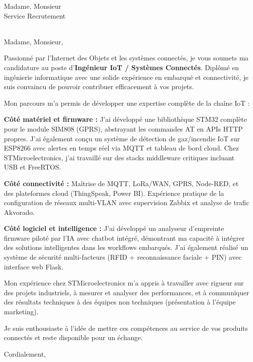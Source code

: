 \documentclass[11pt,a4paper]{letter}
\begin{document}
\begin{letter}{Madame, Monsieur \\ Service Recrutement \\ [Nom de l'entreprise] \\ [Adresse]}

\opening{Madame, Monsieur,}

Passionn\'e par l'Internet des Objets et les syst\`emes connect\'es, je vous soumets ma candidature au poste d'\textbf{Ing\'enieur IoT / Syst\`emes Connect\'es}. Dipl\^om\'e en ing\'enierie informatique avec une solide exp\'erience en embarqu\'e et connectivit\'e, je suis convaincu de pouvoir contribuer efficacement \`a vos projets.

Mon parcours m'a permis de d\'evelopper une expertise compl\`ete de la cha\^ine IoT :

\textbf{C\^ot\'e mat\'eriel et firmware :} J'ai d\'evelopp\'e une biblioth\`eque STM32 compl\`ete pour le module SIM808 (GPRS), abstrayant les commandes AT en APIs HTTP propres. J'ai \'egalement con\c{c}u un syst\`eme de d\'etection de gaz/incendie IoT sur ESP8266 avec alertes en temps r\'eel via MQTT et tableau de bord cloud. Chez STMicroelectronics, j'ai travaill\'e sur des stacks middleware critiques incluant USB et FreeRTOS.

\textbf{C\^ot\'e connectivit\'e :} Ma\^itrise de MQTT, LoRa/WAN, GPRS, Node-RED, et des plateformes cloud (ThingSpeak, Power BI). Exp\'erience pratique de la configuration de r\'eseaux multi-VLAN avec supervision Zabbix et analyse de trafic Akvorado.

\textbf{C\^ot\'e logiciel et intelligence :} J'ai d\'evelopp\'e un analyseur d'empreinte firmware pilot\'e par l'IA avec chatbot int\'egr\'e, d\'emontrant ma capacit\'e \`a int\'egrer des solutions intelligentes dans les workflows embarqu\'es. J'ai \'egalement r\'ealis\'e un syst\`eme de s\'ecurit\'e multi-facteurs (RFID + reconnaissance faciale + PIN) avec interface web Flask.

Mon exp\'erience chez STMicroelectronics m'a appris \`a travailler avec rigueur sur des projets industriels, \`a mesurer et analyser des performances, et \`a communiquer des r\'esultats techniques \`a des \'equipes non techniques (pr\'esentation \`a l'\'equipe marketing).

Je suis enthousiaste \`a l'id\'ee de mettre ces comp\'etences au service de vos produits connect\'es et reste disponible pour un \'echange.

\closing{Cordialement,}

\end{letter}
\end{document}
